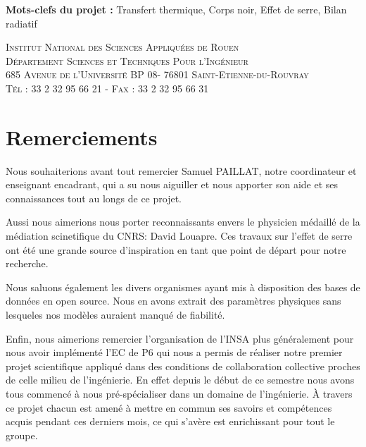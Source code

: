 \documentclass[a4paper, 12pt]{report} %
\begin{document}
\textbf{Mots-clefs du projet :} Transfert thermique, Corps noir, Effet de serre, Bilan radiatif \vspace{\baselineskip} 

\vfill


\begin{center}
	\scshape Institut National des Sciences Appliquées de Rouen \\
	Département Sciences et Techniques Pour l'Ingénieur \\
	685 Avenue de l'Université BP 08- 76801 Saint-Etienne-du-Rouvray \\ Tél : 33 2 32 95 66 21 - Fax : 33 2 32 95 66 31
\end{center}


\newpage
\chapter*{Remerciements} 

\setlength{\parindent}{30pt}
Nous souhaiterions avant tout remercier Samuel PAILLAT, notre
coordinateur et enseignant encadrant, qui a su nous aiguiller
et nous apporter son aide et ses connaissances tout au longs
de ce projet.

	Aussi nous aimerions nous porter reconnaissants 
envers le physicien médaillé de la médiation scinetifique
du CNRS: David Louapre. Ces travaux sur l'effet de serre 
ont été une grande source d'inspiration en tant que point
de départ pour notre recherche. \vspace{\baselineskip}

\indent Nous saluons également les divers organismes ayant 
mis à disposition des bases de données en open source. Nous
en avons extrait des paramètres physiques sans lesqueles 
nos modèles auraient manqué de fiabilité. \vspace{\baselineskip}

\indent Enfin, nous aimerions remercier l'organisation de 
l'INSA plus généralement pour nous avoir implémenté l'EC de P6
qui nous a permis de réaliser notre premier projet
scientifique appliqué dans des conditions de collaboration
collective proches de celle milieu de l'ingénierie. 
En effet depuis le début de ce semestre nous avons tous commencé à 
nous pré-spécialiser dans un domaine de l'ingénierie. À travers 
ce projet chacun est amené à mettre en commun ses savoirs et 
compétences acquis pendant ces derniers mois, ce qui s'avère est 
enrichissant pour tout le groupe.
\end{document}
